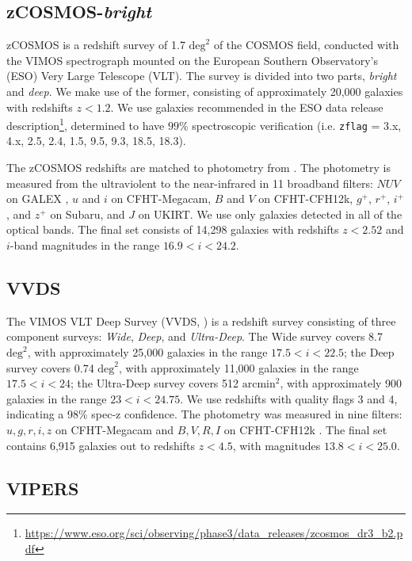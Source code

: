 \subsection{zCOSMOS-\textit{bright}}

zCOSMOS \citep{Lilly2009a} is a redshift survey of 1.7 $\text{deg}^2$ of the COSMOS field, conducted with the VIMOS spectrograph mounted on the European Southern Observatory's (ESO) Very Large Telescope (VLT).
The survey is divided into two parts, \textit{bright} and \textit{deep}. 
We make use of the former, consisting of approximately 20,000 galaxies with redshifts $z < 1.2$.
We use galaxies recommended in the ESO data release description\footnote{\url{https://www.eso.org/sci/observing/phase3/data_releases/zcosmos_dr3_b2.pdf}}, determined to have $99\%$ spectroscopic verification (i.e. \texttt{zflag} = 3.x, 4.x, 2.5, 2.4, 1.5, 9.5, 9.3, 18.5, 18.3).

The zCOSMOS redshifts are matched to photometry from \citet{Ilbert2009}.
The photometry is measured from the ultraviolent to the near-infrared in 11 broadband filters: $NUV$ on GALEX \citep{Martin2005a}, $u$ and $i$ on CFHT-Megacam, $B$ and $V$ on CFHT-CFH12k, $g^+$, $r^+$, $i^+$, and $z^+$ on Subaru, and $J$ on UKIRT.
We use only galaxies detected in all of the optical bands.
The final set consists of 14,298 galaxies with redshifts $z < 2.52$ and $i$-band magnitudes in the range $16.9 < i < 24.2$.

\subsection{VVDS}

The VIMOS VLT Deep Survey (VVDS, \citealt{LeFevre2013b}) is a redshift survey consisting of three component surveys: \textit{Wide}, \textit{Deep}, and \textit{Ultra-Deep}. 
The Wide survey covers 8.7 $\text{deg}^2$, with approximately 25,000 galaxies in the range $17.5 < i < 22.5$; the Deep survey covers 0.74 $\text{deg}^2$, with approximately 11,000 galaxies in the range $17.5 < i < 24$; the Ultra-Deep survey covers 512 $\text{arcmin}^2$, with approximately 900 galaxies in the range $23 < i < 24.75$.
We use redshifts with quality flags 3 and 4, indicating a 98\% spec-z confidence.
The photometry was measured in nine filters: $u,g,r,i,z$ on CFHT-Megacam \citep{Hudelot2012} and $B,V,R,I$ on CFHT-CFH12k \citep{LeFevre2004}.
The final set contains 6,915 galaxies out to redshifts $z < 4.5$, with magnitudes $ 13.8 < i < 25.0$.

\subsection{VIPERS}

